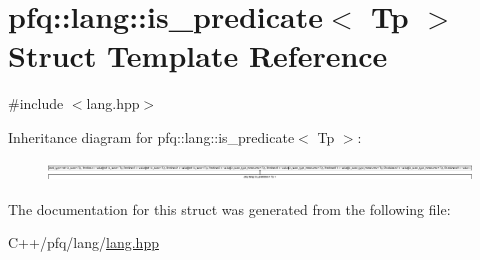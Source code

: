 \hypertarget{structpfq_1_1lang_1_1is__predicate}{\section{pfq\+:\+:lang\+:\+:is\+\_\+predicate$<$ Tp $>$ Struct Template Reference}
\label{structpfq_1_1lang_1_1is__predicate}
}


{\ttfamily \#include $<$lang.\+hpp$>$}

Inheritance diagram for pfq\+:\+:lang\+:\+:is\+\_\+predicate$<$ Tp $>$\+:\begin{figure}[H]
\begin{center}
\leavevmode
\includegraphics[height=0.513997cm]{structpfq_1_1lang_1_1is__predicate}
\end{center}
\end{figure}


The documentation for this struct was generated from the following file\+:\begin{DoxyCompactItemize}
\item 
C++/pfq/lang/\hyperlink{lang_8hpp}{lang.\+hpp}\end{DoxyCompactItemize}
